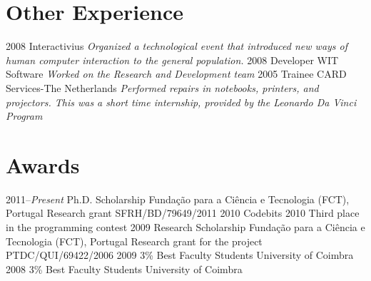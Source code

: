 \documentclass[]{friggeri-cv} %
\begin{document}
\section{Other Experience}

\begin{entrylist}
\entry
{2008}
{Interactivius}
{}
{\emph{Organized a technological event that introduced new ways of human computer interaction to the general population.}}
\entry
{2008}
{Developer}
{WIT Software}
{\emph{Worked on the Research and Development team}}
\entry
{2005}
{Trainee}
{CARD Services-The Netherlands}
{\emph{Performed repairs in notebooks, printers, and projectors. This was a short time internship, provided by the Leonardo Da Vinci Program}}
\end{entrylist}



\section{Awards}

\begin{entrylist}
\entry
{2011--\emph{Present}}
{Ph.D. Scholarship}
{Funda\c{c}\~{a}o para a Ci\^{e}ncia e Tecnologia (FCT), Portugal}
{Research grant SFRH/BD/79649/2011}
\entry
{2010}
{Codebits 2010}
{}
{Third place in the programming contest}
\entry
{2009}
{Research Scholarship}
{Funda\c{c}\~{a}o para a Ci\^{e}ncia e Tecnologia (FCT), Portugal}
{Research grant for the project PTDC/QUI/69422/2006}
\entry
{2009}
{3\% Best Faculty Students}
{University of Coimbra}
{}
\entry
{2008}
{3\% Best Faculty Students}
{University of Coimbra}
{}
\end{entrylist}

\end{document}
